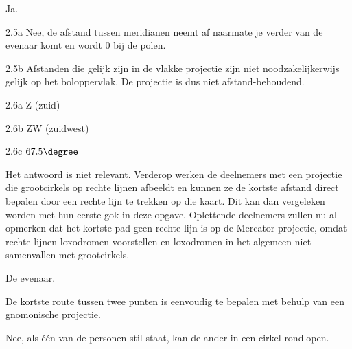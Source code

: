\begin{Antwoord}{2.4}
		Ja.
	
\end{Antwoord}
\begin{Antwoord}{2.5a}
			Nee, de afstand tussen meridianen neemt af naarmate je verder van de evenaar komt en wordt 0 bij de polen.
		
\end{Antwoord}
\begin{Antwoord}{2.5b}
			Afstanden die gelijk zijn in de vlakke projectie zijn niet noodzakelijkerwijs gelijk op het boloppervlak. De projectie is dus niet afstand-behoudend.
		
\end{Antwoord}
\begin{Antwoord}{2.6a}
			Z (zuid)
		
\end{Antwoord}
\begin{Antwoord}{2.6b}
			ZW (zuidwest)
		
\end{Antwoord}
\begin{Antwoord}{2.6c}
			$67.5\degree$
		
\end{Antwoord}
\begin{Antwoord}{2.13}
		Het antwoord is niet relevant. Verderop werken de deelnemers met een projectie die grootcirkels op rechte lijnen afbeeldt en kunnen ze de kortste afstand direct bepalen door een rechte lijn te trekken op die kaart. Dit kan dan vergeleken worden met hun eerste gok in deze opgave. Oplettende deelnemers zullen nu al opmerken dat het kortste pad geen rechte lijn is op de Mercator-projectie, omdat rechte lijnen loxodromen voorstellen en loxodromen in het algemeen niet samenvallen met grootcirkels.
	
\end{Antwoord}
\begin{Antwoord}{2.14}
		De evenaar.
	
\end{Antwoord}
\begin{Antwoord}{2.15}
		De kortste route tussen twee punten is eenvoudig te bepalen met behulp van een gnomonische projectie.
	
\end{Antwoord}
\begin{Antwoord}{4.1}
		Nee, als \'e\'en van de personen stil staat, kan de ander in een cirkel rondlopen.
	
\end{Antwoord}
